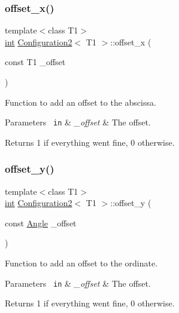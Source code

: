 \subsubsection{\texorpdfstring{offset\_x()}{offset\_x()}}
{\footnotesize\ttfamily template$<$class T1$>$ \\
\mbox{\hyperlink{draw_8hh_aa620a13339ac3a1177c86edc549fda9b}{int}} \mbox{\hyperlink{class_configuration2}{Configuration2}}$<$ T1 $>$\+::offset\+\_\+x (\begin{DoxyParamCaption}\item[{const T1}]{\+\_\+offset }\end{DoxyParamCaption})\hspace{0.3cm}{\ttfamily [inline]}}



Function to add an offset to the abscissa. 


\begin{DoxyParams}[1]{Parameters}
\mbox{\texttt{ in}}  & {\em \+\_\+offset} & The offset. \\
\hline
\end{DoxyParams}
\begin{DoxyReturn}{Returns}
1 if everything went fine, 0 otherwise. 
\end{DoxyReturn}
\mbox{\label{class_configuration2_ae29330a14b06e1ecb22a6bee4e954f81}} 
\subsubsection{\texorpdfstring{offset\_y()}{offset\_y()}}
{\footnotesize\ttfamily template$<$class T1$>$ \\
\mbox{\hyperlink{draw_8hh_aa620a13339ac3a1177c86edc549fda9b}{int}} \mbox{\hyperlink{class_configuration2}{Configuration2}}$<$ T1 $>$\+::offset\+\_\+y (\begin{DoxyParamCaption}\item[{const \mbox{\hyperlink{class_angle}{Angle}}}]{\+\_\+offset }\end{DoxyParamCaption})\hspace{0.3cm}{\ttfamily [inline]}}



Function to add an offset to the ordinate. 


\begin{DoxyParams}[1]{Parameters}
\mbox{\texttt{ in}}  & {\em \+\_\+offset} & The offset. \\
\hline
\end{DoxyParams}
\begin{DoxyReturn}{Returns}
1 if everything went fine, 0 otherwise. 
\end{DoxyReturn}
\mbox{\label{class_configuration2_a3bc8dfea259f6d3f97f6770c09ff6526}} 
